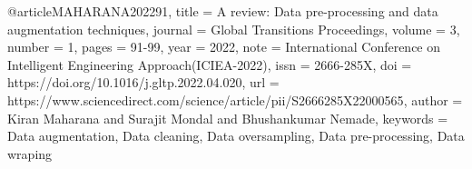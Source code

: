 @article{MAHARANA202291,
title = {A review: Data pre-processing and data augmentation techniques},
journal = {Global Transitions Proceedings},
volume = {3},
number = {1},
pages = {91-99},
year = {2022},
note = {International Conference on Intelligent Engineering Approach(ICIEA-2022)},
issn = {2666-285X},
doi = {https://doi.org/10.1016/j.gltp.2022.04.020},
url = {https://www.sciencedirect.com/science/article/pii/S2666285X22000565},
author = {Kiran Maharana and Surajit Mondal and Bhushankumar Nemade},
keywords = {Data augmentation, Data cleaning, Data oversampling, Data pre-processing, Data wraping}
}